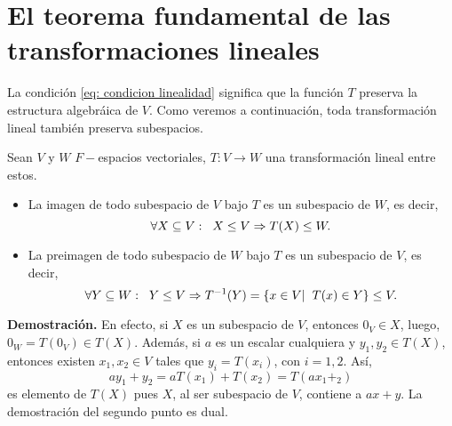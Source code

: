 \section{El teorema fundamental de las transformaciones lineales}

La condición \eqref{eq: condicion linealidad} significa que
la función $T$ preserva la estructura algebráica de $V$. Como
veremos a continuación, toda transformación lineal también
preserva subespacios.
\begin{prop}
Sean $V$ y $W$ $F-$espacios vectoriales,
$T: V \longrightarrow W$ una transformación lineal entre estos.
\begin{itemize}
	\item La imagen de todo subespacio de $V$ bajo $T$ es un 
	subespacio de $W$, es decir,
	\[
	\forall X \subseteq V: \hspace{0.2cm}
	X \leq V \Rightarrow T(X) \leq W.
	\]
	\item La preimagen de todo subespacio de $W$ bajo $T$
	es un subespacio de $V$, es decir, 
	\[
	\forall Y \subseteq W: \hspace{0.2cm}
	Y \leq V \Rightarrow T^{-1}(Y) = 
	\{ x \in V  | \hspace{0.2cm} T(x) \in Y \} \leq V.
	\]
\end{itemize}
\end{prop}
\noindent
\textbf{Demostración.}
En efecto, si $X$ es un subespacio de $V$,
	entonces $0_{V} \in X$, luego, 
	$0_{W} = T(0_{V}) \in T(X)$. Además, si 
	$a$ es un escalar cualquiera y 
	$y_{1}, y_{2} \in T(X)$, entonces existen
	$x_{1}, x_{2} \in V$ tales que 
	$y_{i} = T(x_{i})$, con $i = 1,2$. Así,
	\[
	ay_{1} + y_{2} = a T(x_{1}) + T(x_{2})
	= T(ax_{1} + _{2})
	\]
	es elemento de $T(X)$ pues $X$, al ser subespacio
	de $V$, contiene a $ax + y$.
La demostración del segundo punto es dual.
\QEDB
\vspace{0.2cm}

